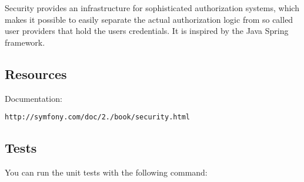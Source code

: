 Security provides an infrastructure for sophisticated authorization systems, which makes it possible to easily separate the actual authorization logic from so called user providers that hold the users credentials. It is inspired by the Java Spring framework.

\subsection*{Resources }

Documentation\+:

{\tt http\+://symfony.\+com/doc/2./book/security.\+html}

\subsection*{Tests }

You can run the unit tests with the following command\+: 
 